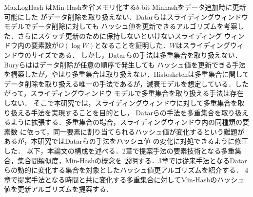 MaxLogHash \cite{Maxloghash}はMin-Hashを省メモリ化する$b$-bit Minhash\cite{b-bit}をデータ追加時に更新可能にした
がデータ削除を取り扱えない．Datarら\cite{Datar}はスライディングウィンドウモデルでデータ削除に対しても
ハッシュ値を更新できるアルゴリズムを考案した．さらにスケッチ更新のために保持しないといけないスライディング
ウィンドウ内の要素数が$O(\log W)$となることを証明した．$W$はスライディングウィンドウのサイズである．
しかし，Datarらの手法は多重集合を取り扱えない．Buryらは\cite{Bury}はデータ削除が任意の順序で発生しても
ハッシュ値を更新できる手法を構築したが，やはり多重集合は取り扱えない．Histosketch\cite{HistoSketch}は多重集合に関して
データ削除を取り扱える唯一の手法であるが，減衰モデルを想定している．したがって，スライディングウィンドウ
モデルで多重集合を取り扱える手法は存在しない．
そこで本研究では，スライディングウィンドウに対して多重集合を取り扱える手法を実現することを目的とし，
Datarらの手法を多重集合を取り扱えるように拡張する．多重集合の場合，スライディングウィンドウ内の同種類の要素数
に依って，同一要素に割り当てられるハッシュ値が変化するという難題があるが，本研究ではDatarらの手法をハッシュ値
の変化に対処できるように修正した．
以下，本論文の構成を述べる．2章で提案手法の要素技術となる多重集合，集合間類似度，Min-Hashの概念を
説明する．3章では従来手法となるDatarらの動的に変化する集合を対象としたハッシュ値更アルゴリズムを紹介する．
4章で提案手法となる時間と共に変化する多重集合に対してMin-Hashのハッシュ値を更新アルゴリズムを提案する．
